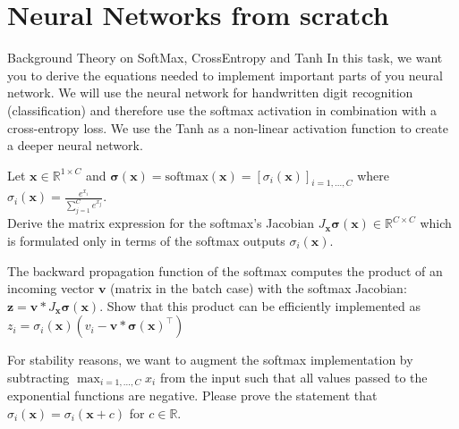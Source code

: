 \documentclass[
	ngerman,
	points=true,%
    solution=true,
    accentcolor=9c,
    colorbacktitle
	]{tudaexercise}
\begin{document}
\section*{Neural Networks from scratch}
\begin{task}{Background Theory on SoftMax, CrossEntropy and Tanh}
In this task, we want you to derive the equations needed to implement important parts of you neural network. We will use the neural network for handwritten digit recognition (classification) and therefore use the softmax activation in combination with a cross-entropy loss. We use the Tanh as a non-linear activation function to create a deeper neural network. 

\begin{subtask}
Let $\mathbf{x} \in \mathbb{R}^{1\times C}$ and $\boldsymbol{\sigma}(\mathbf{x})=\text{softmax}(\mathbf{x})=\left[\sigma_i(\mathbf{x})\right]_{i=1,...,C}$ where $\sigma_i(\mathbf{x})=\frac{e^{x_i}}{\sum_{j=1}^{C}e^{x_j}}$. \\
Derive the matrix expression for the softmax's Jacobian $J_{\mathbf{x}}\boldsymbol{\sigma}(\mathbf{x})\in\mathbb{R}^{C\times C}$ which is formulated only in terms of the softmax outputs $\sigma_i(\mathbf{x})$. 
\end{subtask}
\begin{solution}
\end{solution}

\begin{subtask}
The backward propagation function of the softmax computes the product of an incoming vector $\mathbf{v}$ (matrix in the batch case) with the softmax Jacobian: $\mathbf{z}=\mathbf{v} * J_{\mathbf{x}}\boldsymbol{\sigma}(\mathbf{x})$. Show that this product can be efficiently implemented as $z_i=\sigma_i(\mathbf{x})(v_i-\mathbf{v}*\boldsymbol{\sigma}(\mathbf{x})^\intercal)$
\end{subtask}
\begin{solution}
\end{solution}

\begin{subtask}
For stability reasons, we want to augment the softmax implementation by subtracting $\max_{i=1,...,C}x_i$ from the input such that all values passed to the exponential functions are negative. Please prove the statement that $\sigma_i(\mathbf{x})=\sigma_i(\mathbf{x}+c)$ for $c\in\mathbb{R}$. 
\end{subtask}
\begin{solution}  
\end{solution}


\end{task}
\end{document}
